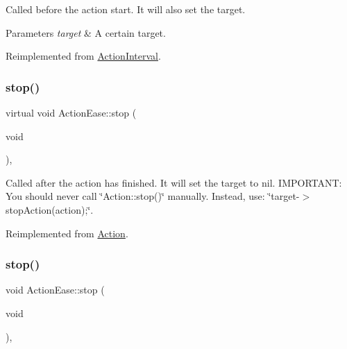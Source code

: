 Called before the action start. It will also set the target.


\begin{DoxyParams}{Parameters}
{\em target} & A certain target. \\
\hline
\end{DoxyParams}


Reimplemented from \hyperlink{classActionInterval_ad3d91186b2c3108488ddbbdbbd982484}{Action\+Interval}.

\mbox{\label{classActionEase_a2f9afe79f5848689a7f6f54c55764275}} 
\subsubsection{\texorpdfstring{stop()}{stop()}\hspace{0.1cm}{\footnotesize\ttfamily [1/2]}}
{\footnotesize\ttfamily virtual void Action\+Ease\+::stop (\begin{DoxyParamCaption}\item[{void}]{ }\end{DoxyParamCaption})\hspace{0.3cm}{\ttfamily [override]}, {\ttfamily [virtual]}}

Called after the action has finished. It will set the \textquotesingle{}target\textquotesingle{} to nil. I\+M\+P\+O\+R\+T\+A\+NT\+: You should never call \char`\"{}\+Action\+::stop()\char`\"{} manually. Instead, use\+: \char`\"{}target-\/$>$stop\+Action(action);\char`\"{}. 

Reimplemented from \hyperlink{classAction_a968267fa7a1dcc46a2976249a712d3c8}{Action}.

\mbox{\label{classActionEase_a1a12083389f0bec7b1de3ef2c832597a}} 
\subsubsection{\texorpdfstring{stop()}{stop()}\hspace{0.1cm}{\footnotesize\ttfamily [2/2]}}
{\footnotesize\ttfamily void Action\+Ease\+::stop (\begin{DoxyParamCaption}\item[{void}]{ }\end{DoxyParamCaption})\hspace{0.3cm}{\ttfamily [override]}, {\ttfamily [virtual]}}

